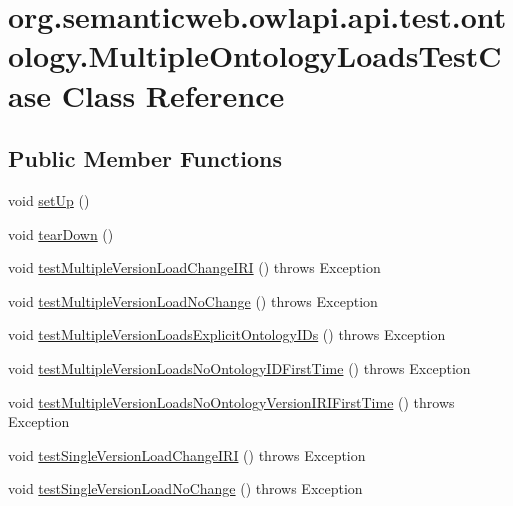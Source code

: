 \hypertarget{classorg_1_1semanticweb_1_1owlapi_1_1api_1_1test_1_1ontology_1_1_multiple_ontology_loads_test_case}{\section{org.\-semanticweb.\-owlapi.\-api.\-test.\-ontology.\-Multiple\-Ontology\-Loads\-Test\-Case Class Reference}
\label{classorg_1_1semanticweb_1_1owlapi_1_1api_1_1test_1_1ontology_1_1_multiple_ontology_loads_test_case}
}
\subsection*{Public Member Functions}
\begin{DoxyCompactItemize}
\item 
void \hyperlink{classorg_1_1semanticweb_1_1owlapi_1_1api_1_1test_1_1ontology_1_1_multiple_ontology_loads_test_case_aba7c3f128568d7959f41a484804344e3}{set\-Up} ()
\item 
void \hyperlink{classorg_1_1semanticweb_1_1owlapi_1_1api_1_1test_1_1ontology_1_1_multiple_ontology_loads_test_case_ae360d8c815f0e7619485a6351b2ed1de}{tear\-Down} ()
\item 
void \hyperlink{classorg_1_1semanticweb_1_1owlapi_1_1api_1_1test_1_1ontology_1_1_multiple_ontology_loads_test_case_a7f095e80425a4db9f706a27e8ba4a08a}{test\-Multiple\-Version\-Load\-Change\-I\-R\-I} ()  throws Exception 
\item 
void \hyperlink{classorg_1_1semanticweb_1_1owlapi_1_1api_1_1test_1_1ontology_1_1_multiple_ontology_loads_test_case_acd383e853208f20ef7aea103159c289e}{test\-Multiple\-Version\-Load\-No\-Change} ()  throws Exception 
\item 
void \hyperlink{classorg_1_1semanticweb_1_1owlapi_1_1api_1_1test_1_1ontology_1_1_multiple_ontology_loads_test_case_ab1842e1cbbe89e3091304463fdcef88d}{test\-Multiple\-Version\-Loads\-Explicit\-Ontology\-I\-Ds} ()  throws Exception 
\item 
void \hyperlink{classorg_1_1semanticweb_1_1owlapi_1_1api_1_1test_1_1ontology_1_1_multiple_ontology_loads_test_case_a336ebd387a6305dd38d47f955ef625fa}{test\-Multiple\-Version\-Loads\-No\-Ontology\-I\-D\-First\-Time} ()  throws Exception 
\item 
void \hyperlink{classorg_1_1semanticweb_1_1owlapi_1_1api_1_1test_1_1ontology_1_1_multiple_ontology_loads_test_case_ad9ab23b387576cf1e78c8e088c6943a2}{test\-Multiple\-Version\-Loads\-No\-Ontology\-Version\-I\-R\-I\-First\-Time} ()  throws Exception 
\item 
void \hyperlink{classorg_1_1semanticweb_1_1owlapi_1_1api_1_1test_1_1ontology_1_1_multiple_ontology_loads_test_case_a1f14033084412a01c340cf29578f73ae}{test\-Single\-Version\-Load\-Change\-I\-R\-I} ()  throws Exception 
\item 
void \hyperlink{classorg_1_1semanticweb_1_1owlapi_1_1api_1_1test_1_1ontology_1_1_multiple_ontology_loads_test_case_a5c1c0546b65ca2169b6d67713e0beed2}{test\-Single\-Version\-Load\-No\-Change} ()  throws Exception 
\end{DoxyCompactItemize}

